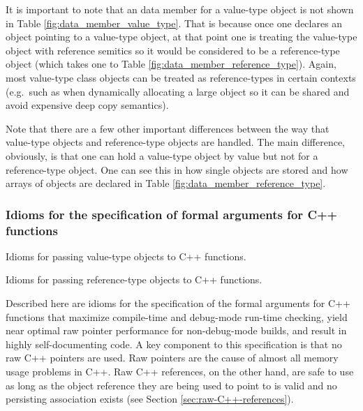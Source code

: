 \documentclass[pdf,ps2pdf,11pt]{SANDreport}
\begin{document}
It is important to note that an {} data member for a
value-type object is not shown in Table
{}\ref{fig:data_member_value_type}.  That is because once one declares
an {} object pointing to a value-type object, at that point
one is treating the value-type object with reference semitics so it
would be considered to be a reference-type object (which takes one to
Table {}\ref{fig:data_member_reference_type}).  Again, most value-type
class objects can be treated as reference-types in certain contexts
(e.g.\ such as when dynamically allocating a large {}
object so it can be shared and avoid expensive deep copy semantics).

Note that there are a few other important differences between the way
that value-type objects and reference-type objects are handled.  The
main difference, obviously, is that one can hold a value-type object
by value but not for a reference-type object.  One can see this in how
single objects are stored and how arrays of objects are declared in
Table {}\ref{fig:data_member_reference_type}.


%
{}\subsubsection{Idioms for the specification of formal arguments for
C++ functions}
\label{sec:idioms-for-passing-arguments}
%

\begin{table}[p]
%
\begin{center}
%
%

%
%
%
\end{center}
\caption{\label{fig:func_args_value_type}
Idioms for passing value-type objects to C++ functions.}
%
\end{table}


\begin{table}[p]
%
\begin{center}

\end{center}
\caption{\label{fig:func_args_ref_type}
Idioms for passing reference-type objects to C++ functions.}
\end{table}


Described here are idioms for the specification of the formal
arguments for C++ functions that maximize compile-time and debug-mode
run-time checking, yield near optimal raw pointer performance for
non-debug-mode builds, and result in highly self-documenting code.  A
key component to this specification is that no raw C++ pointers are
used.  Raw pointers are the cause of almost all memory usage problems
in C++.  Raw C++ references, on the other hand, are safe to use as
long as the object reference they are being used to point to is valid
and no persisting association exists (see Section
{}\ref{sec:raw-C++-references}).
\end{document}
